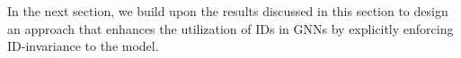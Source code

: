 

In the next section, we build upon the results discussed in this section to design an approach that enhances the utilization of IDs in GNNs by explicitly enforcing ID-invariance to the model.
